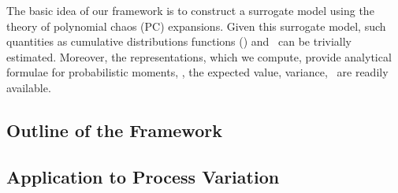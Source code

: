 The basic idea of our framework is to construct a surrogate model using the theory of polynomial chaos (PC) expansions. Given this surrogate model, such quantities as cumulative distributions functions (\cdfs) and \pdfs\ can be trivially estimated. Moreover, the representations, which we compute, provide analytical formulae for probabilistic moments, \ie, the expected value, variance, \etc\ are readily available.

\subsection{Outline of the Framework} 


\subsection{Application to Process Variation} 

